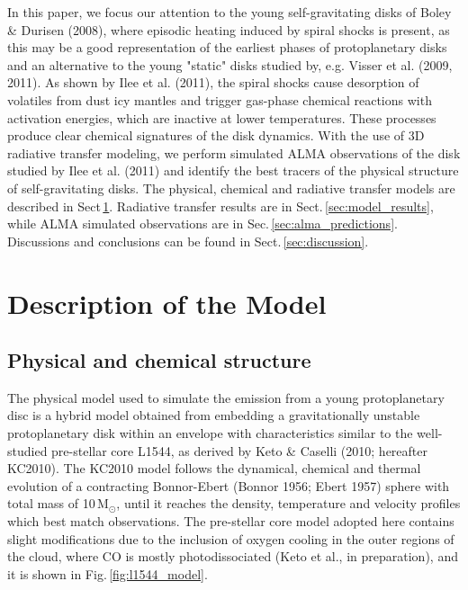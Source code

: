 \documentclass[useAMS,usenatbib]{mn2e}
\begin{document}
In this paper, we focus our attention to the young self-gravitating disks of Boley \& Durisen (2008), where episodic heating induced by spiral shocks is present, as this may be a good representation of the earliest phases of protoplanetary disks and an alternative to the young "static" disks studied by, e.g. Visser et al. (2009, 2011). As shown by Ilee et al. (2011), the spiral shocks cause desorption of volatiles from dust icy mantles and trigger gas-phase chemical reactions with activation energies, which are inactive at lower temperatures. These processes produce clear chemical signatures of the disk dynamics. With the use of 3D radiative transfer modeling, we perform simulated ALMA observations of the disk studied by Ilee et al. (2011) and identify the best tracers of the physical structure of self-gravitating disks. The physical, chemical and radiative transfer models are described in Sect\,\ref{sec:description_model}. Radiative transfer results are in Sect.\,\ref{sec:model_results}, while ALMA simulated observations are in Sec.\,\ref{sec:alma_predictions}. Discussions and conclusions can be found in Sect.\,\ref{sec:discussion}. 
  
  
\section{Description of the Model} \label{sec:description_model}

\subsection{Physical and chemical structure} \label{subsec:physical_structure}

The physical model used to simulate the emission from a young protoplanetary disc is a hybrid model obtained from embedding a gravitationally unstable protoplanetary disk  within an envelope with characteristics similar to the well-studied pre-stellar core L1544, as derived by Keto \& Caselli (2010; hereafter KC2010). The KC2010 model follows the dynamical, chemical and thermal evolution of a contracting Bonnor-Ebert (Bonnor 1956; Ebert 1957) sphere with total mass of 10\,M$_{\odot}$, until it reaches the density, temperature and velocity profiles which best match observations. The pre-stellar core model adopted here contains slight modifications due to the inclusion of oxygen cooling in the outer regions of the cloud, where CO is mostly photodissociated (Keto et al., in preparation), and it is shown in Fig.\,\ref{fig:l1544_model}.  \newline
\end{document}
